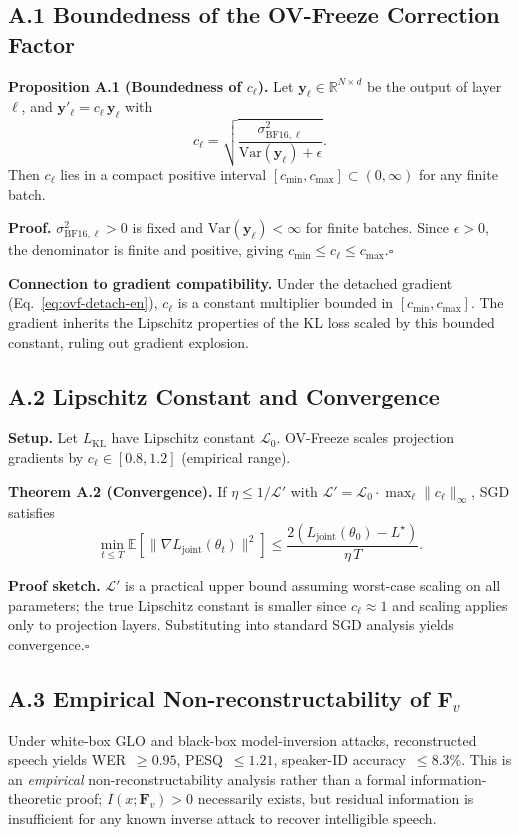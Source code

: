 \documentclass[final,5p,times,number]{elsarticle}
\begin{document}
\subsection{A.1 Boundedness of the OV-Freeze Correction Factor}

\noindent\textbf{Proposition A.1 (Boundedness of $c_\ell$).} Let $\bm{y}_\ell\in\mathbb{R}^{N\times d}$ be the output of layer $\ell$, and $\bm{y}'_\ell = c_\ell\,\bm{y}_\ell$ with
\[
c_\ell = \sqrt{\frac{\sigma^2_{\mathrm{BF16},\ell}}{\mathrm{Var}(\bm{y}_\ell)+\epsilon}}.
\]
Then $c_\ell$ lies in a compact positive interval $[c_{\min}, c_{\max}] \subset (0, \infty)$ for any finite batch.

\noindent\textbf{Proof.} $\sigma^2_{\mathrm{BF16},\ell}>0$ is fixed and $\mathrm{Var}(\bm{y}_\ell)<\infty$ for finite batches. Since $\epsilon>0$, the denominator is finite and positive, giving $c_{\min}\le c_\ell\le c_{\max}$.\hfill$\square$

\medskip
\noindent\textbf{Connection to gradient compatibility.} Under the detached gradient (Eq.~\eqref{eq:ovf-detach-en}), $c_\ell$ is a constant multiplier bounded in $[c_{\min}, c_{\max}]$. The gradient inherits the Lipschitz properties of the KL loss scaled by this bounded constant, ruling out gradient explosion.

\subsection{A.2 Lipschitz Constant and Convergence}

\noindent\textbf{Setup.} Let $L_{\mathrm{KL}}$ have Lipschitz constant $\mathcal{L}_0$. OV-Freeze scales projection gradients by $c_\ell\in[0.8,1.2]$ (empirical range).

\noindent\textbf{Theorem A.2 (Convergence).} If $\eta\le 1/\mathcal{L}'$ with $\mathcal{L}' = \mathcal{L}_0\cdot\max_\ell\|c_\ell\|_\infty$, SGD satisfies
\[
\min_{t\le T}\mathbb{E}[\|\nabla L_{\mathrm{joint}}(\theta_t)\|^2] \le \frac{2(L_{\mathrm{joint}}(\theta_0) - L^\star)}{\eta\,T}.
\]

\noindent\textbf{Proof sketch.} $\mathcal{L}'$ is a practical upper bound assuming worst-case scaling on all parameters; the true Lipschitz constant is smaller since $c_\ell\approx 1$ and scaling applies only to projection layers. Substituting into standard SGD analysis yields convergence.\hfill$\square$

\subsection{A.3 Empirical Non-reconstructability of $\bm{F}_v$}

Under white-box GLO and black-box model-inversion attacks, reconstructed speech yields WER~$\ge 0.95$, PESQ~$\le 1.21$, speaker-ID accuracy~$\le 8.3\%$. This is an \emph{empirical} non-reconstructability analysis rather than a formal information-theoretic proof; $I(x;\bm{F}_v)>0$ necessarily exists, but residual information is insufficient for any known inverse attack to recover intelligible speech.

\balance



\end{document}
